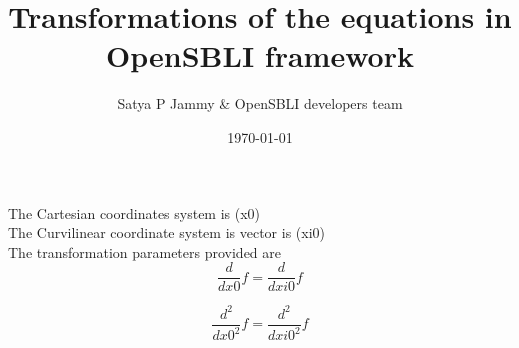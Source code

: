 \documentclass{article}
\title{Transformations of the equations in OpenSBLI framework}
\author{Satya P Jammy \& OpenSBLI developers team}
\date{\today}
\begin{document}
\maketitle
\noindent The Cartesian coordinates system is (x0)\\\noindent The Curvilinear coordinate system is vector is (xi0)\\\noindent The transformation parameters provided are \\\begin{dmath}\frac{d}{d x0} f = \frac{d}{d xi0} f\end{dmath}

\begin{dmath}\frac{d^{2}}{d x0^{2}}  f = \frac{d^{2}}{d xi0^{2}}  f\end{dmath}
\end{document}
